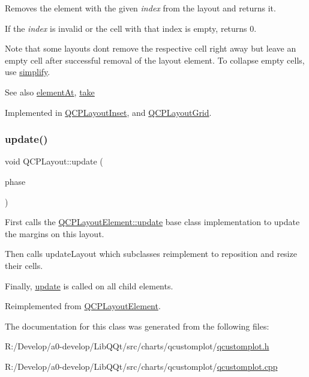 Removes the element with the given {\itshape index} from the layout and returns it.

If the {\itshape index} is invalid or the cell with that index is empty, returns 0.

Note that some layouts don\textquotesingle{}t remove the respective cell right away but leave an empty cell after successful removal of the layout element. To collapse empty cells, use \mbox{\hyperlink{class_q_c_p_layout_a41e6ac049143866e8f8b4964efab01b2}{simplify}}.

\begin{DoxySeeAlso}{See also}
\mbox{\hyperlink{class_q_c_p_layout_afa73ca7d859f8a3ee5c73c9b353d2a56}{element\+At}}, \mbox{\hyperlink{class_q_c_p_layout_ada26cd17e56472b0b4d7fbbc96873e4c}{take}} 
\end{DoxySeeAlso}


Implemented in \mbox{\hyperlink{class_q_c_p_layout_inset_ad6756a3b507e20496aaf7f5ca16c47d1}{Q\+C\+P\+Layout\+Inset}}, and \mbox{\hyperlink{class_q_c_p_layout_grid_acc1277394ff8a6432e111ff9463e6375}{Q\+C\+P\+Layout\+Grid}}.

\mbox{\label{class_q_c_p_layout_a34ab477e820537ded7bade4399c482fd}} 
\subsubsection{\texorpdfstring{update()}{update()}}
{\footnotesize\ttfamily void Q\+C\+P\+Layout\+::update (\begin{DoxyParamCaption}\item[{\mbox{\hyperlink{class_q_c_p_layout_element_a0d83360e05735735aaf6d7983c56374d}{Update\+Phase}}}]{phase }\end{DoxyParamCaption})\hspace{0.3cm}{\ttfamily [virtual]}}

First calls the \mbox{\hyperlink{class_q_c_p_layout_element_a929c2ec62e0e0e1d8418eaa802e2af9b}{Q\+C\+P\+Layout\+Element\+::update}} base class implementation to update the margins on this layout.

Then calls update\+Layout which subclasses reimplement to reposition and resize their cells.

Finally, \mbox{\hyperlink{class_q_c_p_layout_a34ab477e820537ded7bade4399c482fd}{update}} is called on all child elements. 

Reimplemented from \mbox{\hyperlink{class_q_c_p_layout_element_a929c2ec62e0e0e1d8418eaa802e2af9b}{Q\+C\+P\+Layout\+Element}}.



The documentation for this class was generated from the following files\+:\begin{DoxyCompactItemize}
\item 
R\+:/\+Develop/a0-\/develop/\+Lib\+Q\+Qt/src/charts/qcustomplot/\mbox{\hyperlink{qcustomplot_8h}{qcustomplot.\+h}}\item 
R\+:/\+Develop/a0-\/develop/\+Lib\+Q\+Qt/src/charts/qcustomplot/\mbox{\hyperlink{qcustomplot_8cpp}{qcustomplot.\+cpp}}\end{DoxyCompactItemize}
